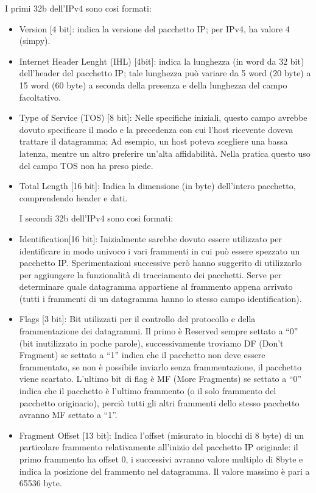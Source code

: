 I primi 32b dell’IPv4 sono cosi formati:
\begin{itemize}
\item	Version [4 bit]: indica la versione del pacchetto IP; per IPv4, ha valore 4 (simpy).
\item	Internet Header Lenght (IHL) [4bit]: indica la lunghezza (in word da 32 bit) dell’header del pacchetto IP; tale lunghezza può variare da 5 word (20 byte) a 15 word (60 byte) a seconda della presenza e della lunghezza del campo facoltativo.
\item	Type of Service (TOS) [8 bit]: Nelle specifiche iniziali, questo campo avrebbe dovuto specificare il modo e la precedenza con cui l’host ricevente doveva trattare il datagramma;
Ad esempio, un host poteva scegliere una bassa latenza, mentre un altro preferire un’alta affidabilità. Nella pratica questo uso del campo TOS non ha preso piede.
\item	Total Length [16 bit]: Indica la dimensione (in byte) dell’intero pacchetto, comprendendo header e dati.

I secondi 32b dell’IPv4 sono cosi formati:
\item	Identification[16 bit]: Inizialmente sarebbe dovuto essere utilizzato per identificare in modo univoco i vari frammenti in cui può essere spezzato un pacchetto IP. Sperimentazioni successive però hanno suggerito di utilizzarlo per aggiungere la funzionalità di tracciamento dei pacchetti. Serve per determinare quale datagramma appartiene al frammento appena arrivato (tutti i frammenti di un datagramma hanno lo stesso campo identification).
\item	Flags [3 bit]: Bit utilizzati per il controllo del protocollo e della frammentazione dei datagrammi. Il primo è Reserved sempre settato a “0” (bit inutilizzato in poche parole), successivamente troviamo DF (Don’t Fragment) se settato a “1” indica che il pacchetto non deve essere frammentato, se non è possibile inviarlo senza frammentazione, il pacchetto viene scartato. L’ultimo bit di flag è MF (More Fragments) se settato a “0” indica che il pacchetto è l’ultimo frammento (o il solo frammento del pacchetto originario), perciò tutti gli altri frammenti dello stesso pacchetto avranno MF settato a “1”. 
\item	Fragment Offset [13 bit]: Indica l’offset (misurato in blocchi di 8 byte) di un particolare frammento relativamente all’inizio del pacchetto IP originale: il primo frammento ha offset 0, i successivi avranno valore multiplo di 8byte e indica la posizione del frammento nel datagramma. Il valore massimo è pari a 65536 byte.
\end{itemize}

